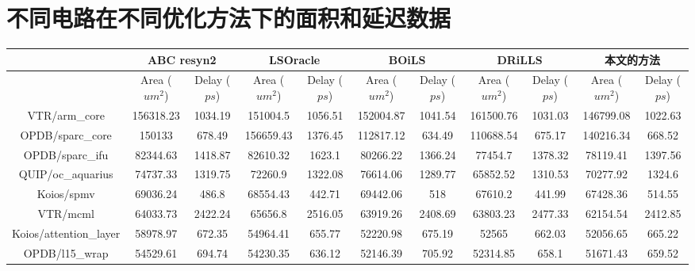 \chapter{不同电路在不同优化方法下的面积和延迟数据} \label{所有电路在不同优化方法下的面积和延迟}
{
\tiny
\setlength{\tabcolsep}{1pt}
\begin{longtable}{|*{11}{c|}}
        \hline
        & \multicolumn{2}{|c|}{ABC resyn2} & \multicolumn{2}{|c|}{LSOracle\cite{LS:LSOracle}} & \multicolumn{2}{|c|}{BOiLS\cite{LS:BOiLS}} & \multicolumn{2}{|c|}{DRiLLS\cite{LS:DRiLLS}} & \multicolumn{2}{|c|}{本文的方法}\\
        \hline
        & Area ($um^2$) & Delay ($ps$) & Area ($um^2$) & Delay ($ps$) & Area ($um^2$) & Delay ($ps$) & Area ($um^2$) & Delay ($ps$) & Area ($um^2$) & Delay ($ps$) \\
        \hline
        VTR/arm\_core & 156318.23 & 1034.19 & 151004.5 & 1056.51 & 152004.87 & 1041.54 & 161500.76 & 1031.03 & 146799.08 & 1022.63 \\
        \hline
        OPDB/sparc\_core & 150133 & 678.49 & 156659.43 & 1376.45 & 112817.12 & 634.49 & 110688.54 & 675.17 & 140216.34 & 668.52 \\
        \hline
        OPDB/sparc\_ifu & 82344.63 & 1418.87 & 82610.32 & 1623.1 & 80266.22 & 1366.24 & 77454.7 & 1378.32 & 78119.41 & 1397.56 \\
        \hline
        QUIP/oc\_aquarius & 74737.33 & 1319.75 & 72260.9 & 1322.08 & 76614.06 & 1289.77 & 65852.52 & 1310.53 & 70277.92 & 1324.6 \\
        \hline
        Koios/spmv & 69036.24 & 486.8 & 68554.43 & 442.71 & 69442.06 & 518 & 67610.2 & 441.99 & 67428.36 & 514.55 \\
        \hline
        VTR/mcml & 64033.73 & 2422.24 & 65656.8 & 2516.05 & 63919.26 & 2408.69 & 63803.23 & 2477.33 & 62154.54 & 2412.85 \\
        \hline
        Koios/attention\_layer & 58978.97 & 672.35 & 54964.41 & 655.77 & 52220.98 & 675.19 & 52565 & 662.03 & 52056.65 & 665.22 \\
        \hline
        OPDB/l15\_wrap & 54529.61 & 694.74 & 54230.35 & 636.12 & 52146.39 & 705.92 & 52314.85 & 658.1 & 51671.43 & 659.52 \\

\end{longtable}}
